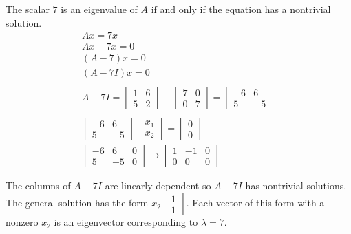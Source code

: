 \documentclass{article}
\begin{document}
  The scalar $ 7 $ is an eigenvalue of $ A $ if and only if the equation has a nontrivial solution.
  \[
      \begin{gathered}
      Ax=7x\\
      Ax-7x=0\\
      (A-7)x=0\\
      (A-7I)x=0\\
      ~\\
      A-7I=
      \begin{bmatrix}
          1 &6\\
          5 &2
      \end{bmatrix}-
      \begin{bmatrix}
          7 &0\\
          0 &7
      \end{bmatrix}=
      \begin{bmatrix}
          -6 &6\\
          5 &-5
      \end{bmatrix}\\
      ~\\
      \begin{bmatrix}
          -6 &6\\
          5 &-5
      \end{bmatrix}
      \begin{bmatrix}
          x_{1}\\
          x_{2}  
      \end{bmatrix}=
      \begin{bmatrix}
          0\\
          0
      \end{bmatrix}\\
      \begin{bmatrix}
          -6 &6 &0\\
          5 &-5 &0
      \end{bmatrix}\to
      \begin{bmatrix}
          1 &-1 &0\\              
          0 &0 &0
      \end{bmatrix} 
      \end{gathered}
  \]

  The columns of $ A-7I $ are linearly dependent so $ A-7I $ has nontrivial solutions. The general solution has the form $ x_{2} \begin{bmatrix}
          1\\
          1
  \end{bmatrix} $. Each vector of this form with a nonzero $ x_{2} $ is an eigenvector corresponding to $ \lambda=7 $.
\end{document}
